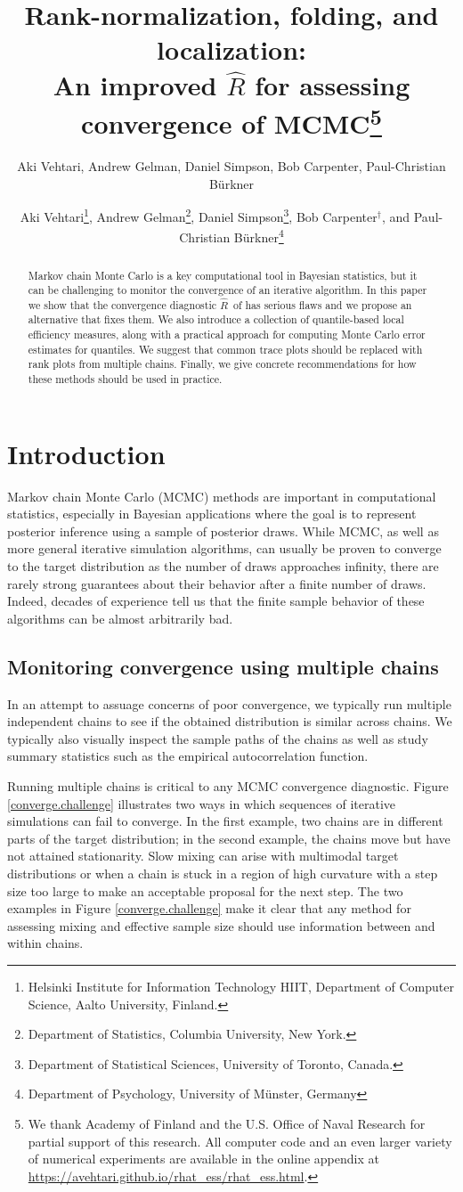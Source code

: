 \documentclass[american,]{article}
\title{Rank-normalization, folding, and localization:\\
  An improved $\widehat{R}$ for assessing convergence of MCMC\footnote{We thank Academy of Finland and the U.S. Office of Naval Research for partial support of this research.  All computer code and an 
even larger variety of numerical experiments are available in the online 
appendix at \url{https://avehtari.github.io/rhat_ess/rhat_ess.html}.}\vspace{.1in}}
\author{Aki Vehtari, Andrew Gelman, Daniel Simpson, Bob Carpenter, Paul-Christian Bürkner}
\author{
Aki Vehtari\footnote{Helsinki Institute for Information Technology HIIT,
  Department of Computer Science, Aalto University, Finland.},
   Andrew Gelman\footnote{Department of Statistics, Columbia University, New York.},
 Daniel Simpson\footnote{Department of Statistical Sciences, University of Toronto, Canada.},
 Bob Carpenter$^{\dagger}$,
and Paul-Christian B\"{u}rkner\footnote{Department of Psychology, University of M\"{u}nster, Germany}
}
\newcommand{\Rhat}{$\widehat{R}$}
\theoremstyle{definition}
\begin{document}
\maketitle
\begin{abstract}
  Markov chain Monte Carlo is a key computational tool in Bayesian 
  statistics, but it can be challenging to monitor the convergence of an iterative algorithm.
In this paper we show that the convergence diagnostic \Rhat\ 
of \citet{Gelman+Rubin:1992} has serious flaws and we
propose an alternative that fixes them. We also introduce
  a collection of quantile-based local efficiency
  measures, along with a practical approach for computing Monte Carlo error
  estimates for quantiles. We suggest that common trace plots should
  be replaced with rank plots from multiple chains. Finally, we give
  concrete recommendations for how these methods should be used
  in practice.
\end{abstract}

\hypertarget{introduction}{%
\section{Introduction}\label{introduction}}

Markov chain Monte Carlo (MCMC) methods are important in computational statistics, especially 
in Bayesian applications where the goal is to represent
posterior inference using a sample of posterior draws. While MCMC, 
as well as more general iterative
simulation algorithms, can usually be proven to converge
to the target distribution as the number of draws approaches infinity,
there are rarely strong guarantees about their behavior after a 
finite number of draws. Indeed, decades of experience tell us that
the finite sample behavior of these algorithms can be almost arbitrarily bad.


\subsection{Monitoring convergence using multiple chains}


In an attempt to assuage concerns of poor convergence, we typically run multiple 
independent chains  to see if the obtained 
distribution is similar across chains.  We typically also visually inspect
the sample paths of the chains as well as study summary statistics such as
 the empirical autocorrelation function. 

Running multiple chains is critical to any MCMC convergence diagnostic. Figure
\ref{converge.challenge} illustrates two ways in which sequences of
iterative simulations can fail to converge.  In the first example, two chains
are in different parts of the target distribution; in the second
example, the chains move but have not attained stationarity. Slow mixing can arise with multimodal target distributions or when a chain is
stuck in a region of high curvature with a step size too large to make an
acceptable proposal for the next step. The two examples in Figure \ref{converge.challenge}  make it clear that 
any method for assessing mixing and effective sample size should use information
between and within chains.
\end{document}
